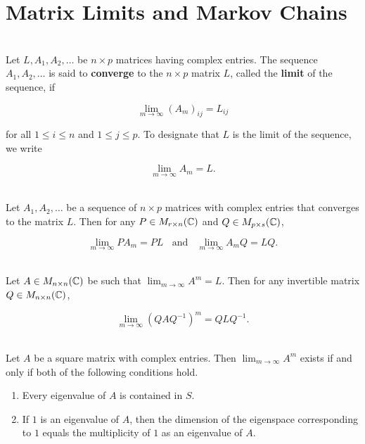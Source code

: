 \section{Matrix Limits and Markov Chains}

\begin{definition}
	\hfill\\
	Let $L, A_1, A_2, \dots$ be $n \times p$ matrices having complex entries. The sequence $A_1, A_2, \dots$ is said to \textbf{converge} to the $n \times p$ matrix $L$, called the \textbf{limit} of the sequence, if

	\[\lim_{m \to \infty}(A_m)_{ij} = L_{ij}\]

	for all $1 \leq i \leq n$ and $1 \leq j \leq p$. To designate that $L$ is the limit of the sequence, we write

	\[\lim_{m \to \infty}A_m = L.\]
\end{definition}

\begin{theorem}
	\hfill\\
	Let $A_1, A_2, \dots$ be a sequence of $n \times p$ matrices with complex entries that converges to the matrix $L$. Then for any $P \in M_{r \times n}(\mathbb{C})$ and $Q \in M_{p \times s}(\mathbb{C})$,

	\[\lim_{m \to \infty}PA_m = PL\ \ \ \ \text{and}\ \ \ \ \lim_{m \to \infty}A_mQ = LQ.\]
\end{theorem}

\begin{corollary}
	\hfill\\
	Let $A \in M_{n \times n}(\mathbb{C})$ be such that $\displaystyle\lim_{m \to \infty}A^m = L$. Then for any invertible matrix $Q \in M_{n \times n}(\mathbb{C})$,

	\[\lim_{m \to \infty}(QAQ^{-1})^m = QLQ^{-1}.\]
\end{corollary}

\begin{theorem}
	\hfill\\
	Let $A$ be a square matrix with complex entries. Then $\displaystyle\lim_{m \to \infty}A^m$ exists if and only if both of the following conditions hold.

	\begin{enumerate}
		\item Every eigenvalue of $A$ is contained in $S$.
		\item If $1$ is an eigenvalue of $A$, then the dimension of the eigenspace corresponding to $1$ equals the multiplicity of $1$ as an eigenvalue of $A$.
	\end{enumerate}
\end{theorem}

